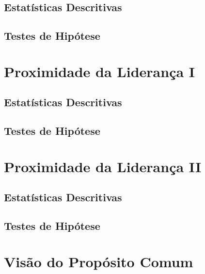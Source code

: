 \documentclass[]{book}
\begin{document}
\hypertarget{estatisticas-descritivas-6}{%
\subsection{Estatísticas Descritivas}\label{estatisticas-descritivas-6}}

\hypertarget{testes-de-hipotese-6}{%
\subsection{Testes de Hipótese}\label{testes-de-hipotese-6}}

\hypertarget{proximidade-da-lideranca-i}{%
\section{Proximidade da Liderança I}\label{proximidade-da-lideranca-i}}

\hypertarget{estatisticas-descritivas-7}{%
\subsection{Estatísticas Descritivas}\label{estatisticas-descritivas-7}}

\hypertarget{testes-de-hipotese-7}{%
\subsection{Testes de Hipótese}\label{testes-de-hipotese-7}}

\hypertarget{proximidade-da-lideranca-ii}{%
\section{Proximidade da Liderança II}\label{proximidade-da-lideranca-ii}}

\hypertarget{estatisticas-descritivas-8}{%
\subsection{Estatísticas Descritivas}\label{estatisticas-descritivas-8}}

\hypertarget{testes-de-hipotese-8}{%
\subsection{Testes de Hipótese}\label{testes-de-hipotese-8}}

\hypertarget{visao-do-proposito-comum-1}{%
\section{Visão do Propósito Comum}\label{visao-do-proposito-comum-1}}
\end{document}
